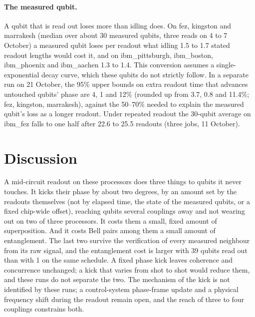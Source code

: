 \documentclass[reprint,amsmath,amssymb,aps,superscriptaddress,nofootinbib]{revtex4-2}
\begin{document}
\paragraph*{The measured qubit.} A qubit that is read out loses more than idling does. On fez, kingston and marrakesh (median over about 30 measured qubits, three reads on 4 to 7 October) a measured qubit loses per readout what idling 1.5 to 1.7 stated readout lengths would cost it, and on ibm\_pittsburgh, ibm\_boston, ibm\_phoenix and ibm\_aachen 1.3 to 1.4. This conversion assumes a single-exponential decay curve, which these qubits do not strictly follow. In a separate run on 21 October, the 95\% upper bounds on extra readout time that advances untouched qubits' phase are 4, 1 and 12\% (rounded up from 3.7, 0.8 and 11.4\%; fez, kingston, marrakesh), against the 50--70\% needed to explain the measured qubit's loss as a longer readout. Under repeated readout the 30-qubit average on ibm\_fez falls to one half after 22.6 to 25.5 readouts (three jobs, 11 October).

\section{Discussion}

A mid-circuit readout on these processors does three things to qubits it never touches. It kicks their phase by about two degrees, by an amount set by the readouts themselves (not by elapsed time, the state of the measured qubits, or a fixed chip-wide offset), reaching qubits several couplings away and not wearing out on two of three processors. It costs them a small, fixed amount of superposition. And it costs Bell pairs among them a small amount of entanglement. The last two survive the verification of every measured neighbour from its raw signal, and the entanglement cost is larger with 39 qubits read out than with 1 on the same schedule. A fixed phase kick leaves coherence and concurrence unchanged; a kick that varies from shot to shot would reduce them, and these runs do not separate the two. The mechanism of the kick is not identified by these runs; a control-system phase-frame update and a physical frequency shift during the readout remain open, and the reach of three to four couplings constrains both.
\end{document}
